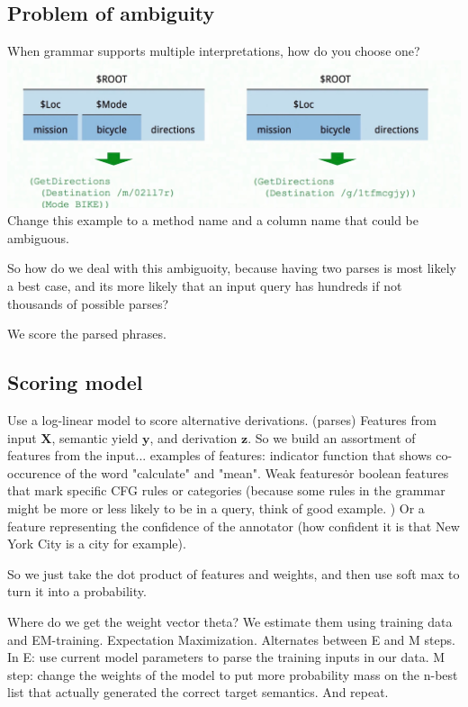 \documentclass[pageno]{jpaper}
\begin{document}
\subsection{Problem of ambiguity}
When grammar supports multiple interpretations, how do you choose one? \\ 
\includegraphics[scale=.2]{imgs/ambig.jpeg}\\
Change this example to a method name and a column name that could be ambiguous.

So how do we deal with this ambiguoity, because having two parses is most likely a best case, and its more likely that an input query has hundreds if not thousands of possible parses?

We score the parsed phrases.

\subsection{Scoring model}
Use a log-linear model to score alternative derivations. (parses) 
Features from input $\textbf{X}$, semantic yield $\textbf{y}$, and derivation $\textbf{z}$. 
So we build an assortment of features from the input... 
examples of features: indicator function that shows co-occurence of the word "calculate" and "mean". Weak features\.
or boolean features that mark specific CFG rules or categories (because some rules in the grammar might be more or less likely to be in a query, think of good example. ) Or a feature representing the confidence of the annotator (how confident it is that New York City is a city for example).

So we just take the dot product of features and weights, and then use soft max to turn it into a probability.

Where do we get the weight vector theta? We estimate them using training data and EM-training. Expectation Maximization. Alternates between E and M steps. In E: use current model parameters to parse the training inputs in our data. M step: change the weights of the model to put more probability mass on the n-best list that actually generated the correct target semantics. And repeat. 
\end{document}
